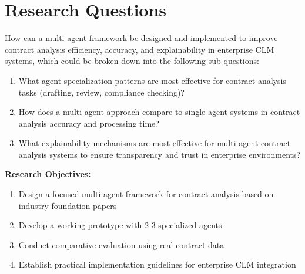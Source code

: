 
\section{Research Questions}\label{section:research_questions}

How can a multi-agent framework be designed and implemented to improve contract analysis efficiency, accuracy, and explainability in enterprise CLM systems, which could be broken down into the following sub-questions:

\begin{enumerate}
    \item What agent specialization patterns are most effective for contract analysis tasks (drafting, review, compliance checking)?
    \item How does a multi-agent approach compare to single-agent systems in contract analysis accuracy and processing time?
    \item What explainability mechanisms are most effective for multi-agent contract analysis systems to ensure transparency and trust in enterprise environments?
\end{enumerate}

\textbf{Research Objectives:}
\begin{enumerate}
    \item Design a focused multi-agent framework for contract analysis based on industry foundation papers
    \item Develop a working prototype with 2-3 specialized agents
    \item Conduct comparative evaluation using real contract data
    \item Establish practical implementation guidelines for enterprise CLM integration
\end{enumerate}

\break

